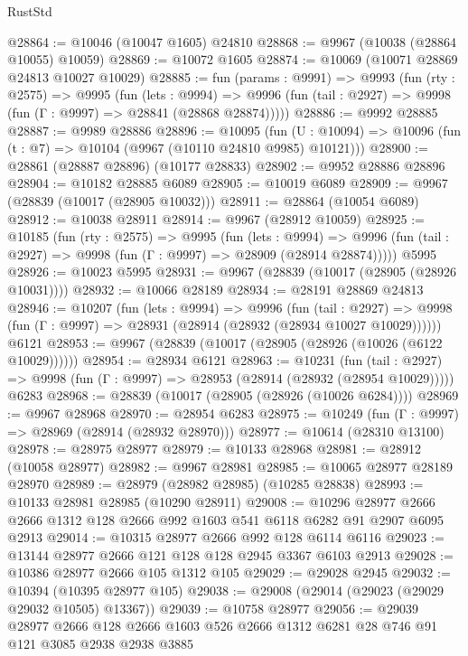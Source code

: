 \begin{lexlean}{RustStd}
\begin{coremodule}
@28864 := @10046 (@10047 @1605) @24810
@28868 := @9967 (@10038 (@28864 @10055) @10059)
@28869 := @10072 @1605
@28874 := @10069 (@10071 @28869 @24813 @10027 @10029)
@28885 := fun (params : @9991) =>
  @9993
    (fun (rty : @2575) =>
    @9995
      (fun (lets : @9994) =>
      @9996 (fun (tail : @2927) => @9998 (fun (Γ : @9997) => @28841 (@28868 @28874)))))
@28886 := @9992 @28885
@28887 := @9989 @28886
@28896 := @10095
    (fun (U : @10094) => @10096 (fun (t : @7) => @10104 (@9967 (@10110 @24810 @9985) @10121)))
@28900 := @28861 (@28887 @28896) (@10177 @28833)
@28902 := @9952 @28886 @28896
@28904 := @10182 @28885 @6089
@28905 := @10019 @6089
@28909 := @9967 (@28839 (@10017 (@28905 @10032)))
@28911 := @28864 (@10054 @6089)
@28912 := @10038 @28911
@28914 := @9967 (@28912 @10059)
@28925 := @10185
    (fun (rty : @2575) =>
    @9995
      (fun (lets : @9994) =>
      @9996 (fun (tail : @2927) => @9998 (fun (Γ : @9997) => @28909 (@28914 @28874)))))
    @5995
@28926 := @10023 @5995
@28931 := @9967 (@28839 (@10017 (@28905 (@28926 @10031))))
@28932 := @10066 @28189
@28934 := @28191 @28869 @24813
@28946 := @10207
    (fun (lets : @9994) =>
    @9996
      (fun (tail : @2927) =>
      @9998 (fun (Γ : @9997) => @28931 (@28914 (@28932 (@28934 @10027 @10029))))))
    @6121
@28953 := @9967 (@28839 (@10017 (@28905 (@28926 (@10026 (@6122 @10029))))))
@28954 := @28934 @6121
@28963 := @10231
    (fun (tail : @2927) => @9998 (fun (Γ : @9997) => @28953 (@28914 (@28932 (@28954 @10029)))))
    @6283
@28968 := @28839 (@10017 (@28905 (@28926 (@10026 @6284))))
@28969 := @9967 @28968
@28970 := @28954 @6283
@28975 := @10249 (fun (Γ : @9997) => @28969 (@28914 (@28932 @28970)))
@28977 := @10614 (@28310 @13100)
@28978 := @28975 @28977
@28979 := @10133 @28968
@28981 := @28912 (@10058 @28977)
@28982 := @9967 @28981
@28985 := @10065 @28977 @28189 @28970
@28989 := @28979 (@28982 @28985) (@10285 @28838)
@28993 := @10133 @28981 @28985 (@10290 @28911)
@29008 := @10296
    @28977
    @2666
    @2666
    @1312
    @128
    @2666
    @992
    @1603
    @541
    @6118
    @6282
    @91
    @2907
    @6095
    @2913
@29014 := @10315 @28977 @2666 @992 @128 @6114 @6116
@29023 := @13144 @28977 @2666 @121 @128 @128 @2945 @3367 @6103 @2913
@29028 := @10386 @28977 @2666 @105 @1312 @105
@29029 := @29028 @2945
@29032 := @10394 (@10395 @28977 @105)
@29038 := @29008 (@29014 (@29023 (@29029 @29032 @10505) @13367))
@29039 := @10758 @28977
@29056 := @29039
    @28977
    @2666
    @128
    @2666
    @1603
    @526
    @2666
    @1312
    @6281
    @28
    @746
    @91
    @121
    @3085
    @2938
    @2938
    @3885

\end{coremodule}
\end{lexlean}
